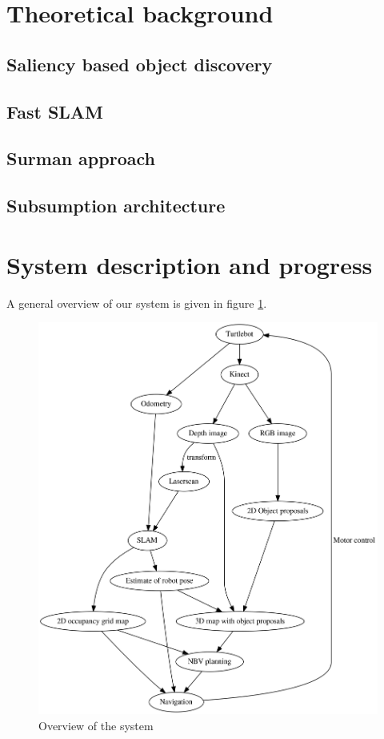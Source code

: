 \documentclass[a4paper,11pt,english]{article}
\begin{document}
\section{Theoretical background}
\label{background}
\subsection{Saliency based object discovery}
\label{background:saliencyobjectdiscovery}
\subsection{Fast SLAM}
\label{background:slam}
\subsection{Surman approach}
\label{background:surman}
\subsection{Subsumption architecture}
\label{background:subsumption}

\section{System description and progress}
\label{system}
A general overview of our system is given in figure \ref{fig:overview}.

\begin{figure}
	\begin{center}
		\includegraphics[width=1\linewidth]{dot/overview.png} 
		\caption{Overview of the system}
		\label{fig:overview}
	\end{center}
\end{figure}
\end{document}
